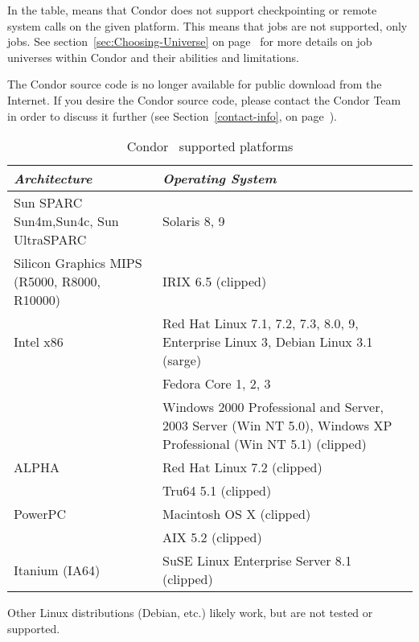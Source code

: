 In the table,  means that Condor does not support
checkpointing or remote system calls on the given platform. 
This means that  jobs are not supported, only
 jobs.
See section~\ref{sec:Choosing-Universe} on
page~\pageref{sec:Choosing-Universe} for more details on job universes
within Condor and their abilities and limitations.

The Condor source code is no longer available for public download from the Internet.  If you 
desire the Condor source code, please contact the Condor Team in order to discuss it further 
(see Section~\ref{contact-info}, on page~\pageref{contact-info}).

\begin{center}
\begin{table}[hbt]
\begin{tabular}{|ll|} \hline
\emph{Architecture} & \emph{Operating System} \\ \hline \hline
Sun SPARC Sun4m,Sun4c, Sun UltraSPARC & Solaris 8, 9 \\ \hline
Silicon Graphics MIPS (R5000, R8000, R10000) & IRIX 6.5 (clipped) \\ \hline
Intel x86 & Red Hat Linux 7.1, 7.2, 7.3, 8.0, 9, Enterprise Linux 3,
Debian Linux 3.1 (sarge) \\
 & Fedora Core 1, 2, 3 \\
 & Windows 2000 Professional and Server, 2003 Server (Win NT 5.0), 
Windows XP Professional (Win NT 5.1) (clipped) \\ \hline
ALPHA & Red Hat Linux 7.2 (clipped) \\
 & Tru64 5.1 (clipped) \\ \hline
PowerPC & Macintosh OS X (clipped) \\
 & AIX 5.2 (clipped) \\ \hline
Itanium (IA64) & SuSE Linux Enterprise Server 8.1 (clipped) \\ \hline
\end{tabular}
\caption{\label{supported-platforms}Condor \VersionNotice\ supported platforms}
\end{table}
\end{center}


\Note Other Linux distributions (Debian, etc.) likely work, but are not tested
or supported.

